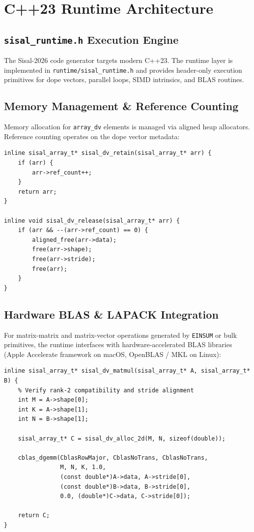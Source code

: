 \chapter{C++23 Runtime Architecture}
\label{chap:cpp23_runtime}

\section{\texttt{sisal\_runtime.h} Execution Engine}
The Sisal-2026 code generator targets modern C++23. The runtime layer is implemented in \texttt{runtime/sisal\_runtime.h} and provides header-only execution primitives for dope vectors, parallel loops, SIMD intrinsics, and BLAS routines.

\section{Memory Management \& Reference Counting}
Memory allocation for \texttt{array\_dv} elements is managed via aligned heap allocators. Reference counting operates on the dope vector metadata:

\begin{lstlisting}[caption={Dope Vector Reference Counting API}]
inline sisal_array_t* sisal_dv_retain(sisal_array_t* arr) {
    if (arr) {
        arr->ref_count++;
    }
    return arr;
}

inline void sisal_dv_release(sisal_array_t* arr) {
    if (arr && --(arr->ref_count) == 0) {
        aligned_free(arr->data);
        free(arr->shape);
        free(arr->stride);
        free(arr);
    }
}
\end{lstlisting}

\section{Hardware BLAS \& LAPACK Integration}
For matrix-matrix and matrix-vector operations generated by \texttt{EINSUM} or bulk primitives, the runtime interfaces with hardware-accelerated BLAS libraries (Apple Accelerate framework on macOS, OpenBLAS / MKL on Linux):

\begin{lstlisting}[caption={BLAS DGEMM Invocation in C++23 Runtime}]
inline sisal_array_t* sisal_dv_matmul(sisal_array_t* A, sisal_array_t* B) {
    % Verify rank-2 compatibility and stride alignment
    int M = A->shape[0];
    int K = A->shape[1];
    int N = B->shape[1];
    
    sisal_array_t* C = sisal_dv_alloc_2d(M, N, sizeof(double));
    
    cblas_dgemm(CblasRowMajor, CblasNoTrans, CblasNoTrans,
                M, N, K, 1.0,
                (const double*)A->data, A->stride[0],
                (const double*)B->data, B->stride[0],
                0.0, (double*)C->data, C->stride[0]);
                
    return C;
}
\end{lstlisting}
